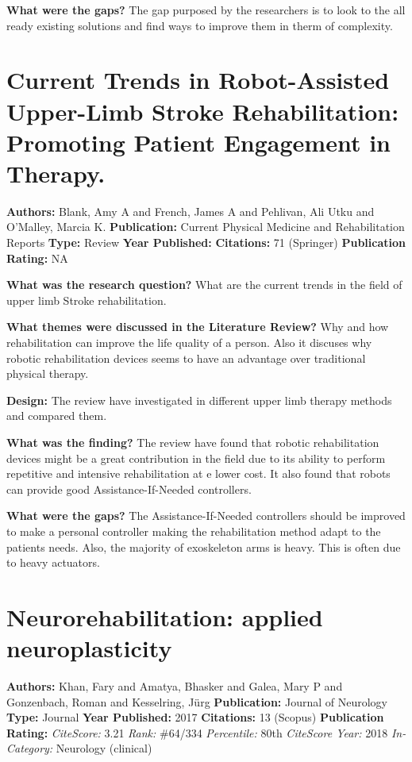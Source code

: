 \textbf{What were the gaps?}   
The gap purposed by the researchers is to look to the all ready existing solutions and find ways to improve them in therm of complexity. 

\section{Current Trends in Robot-Assisted Upper-Limb Stroke Rehabilitation: Promoting Patient Engagement in Therapy.} 
\textbf{Authors:} Blank, Amy A and French, James A and Pehlivan, Ali Utku and O’Malley, Marcia K. \newline
\textbf{Publication:} Current Physical Medicine and Rehabilitation Reports
\textbf{Type:} Review \newline
\textbf{Year Published:} 
\textbf{Citations:} 71 (Springer) \newline 
\textbf{Publication Rating:} NA   

\textbf{What was the research question?}
What are the current trends in the field of upper limb Stroke rehabilitation. 

\textbf{What themes were discussed in the Literature Review?}  
Why and how rehabilitation can improve the life quality of a person. Also it discuses why robotic rehabilitation devices seems to have an advantage over traditional physical therapy. 

\textbf{Design:}  
The review have investigated in different upper limb therapy methods and compared them. 

\textbf{What was the finding?} 
The review have found that robotic rehabilitation devices might be a great contribution in the field due to its ability to perform repetitive and intensive rehabilitation at e lower cost. It also found that robots can provide good Assistance-If-Needed controllers. 


\textbf{What were the gaps?} 
The Assistance-If-Needed controllers should be improved to make a personal controller making the rehabilitation method adapt to the patients needs. Also, the majority of exoskeleton arms is heavy. This is often due to heavy actuators.

\section{Neurorehabilitation: applied neuroplasticity} 
\textbf{Authors:} Khan, Fary and Amatya, Bhasker and Galea, Mary P and Gonzenbach, Roman and Kesselring, J{\"u}rg  \newline
\textbf{Publication:} Journal of Neurology
\textbf{Type:} Journal \newline
\textbf{Year Published:} 2017
\textbf{Citations:} 13 (Scopus)\newline 
\textbf{Publication Rating:}    
\textit{CiteScore:} 3.21  \textit{Rank:} \#64/334 \textit{Percentile:} 80th  \newline
\textit{CiteScore Year:} 2018
\textit{In-Category:} Neurology (clinical)

